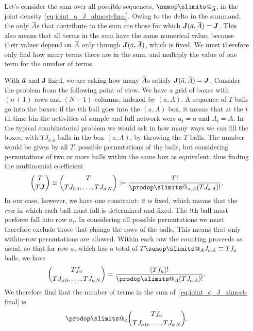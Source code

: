 \documentclass[\ifafour a4paper,12pt,\else a5paper,10pt,\fi%
onecolumn,oneside,article,%
british%
]{memoir}
\makeatletter
\theoremstyle{remark}
\theoremstyle{innote}
\def\sum{\DOTSI\sumop\slimits@}
\def\prod{\DOTSI\prodop\slimits@}
\newcommand*{\defd}{\coloneqq}
\renewcommand*{\|}[1][]{\nonscript\,#1\vert\nonscript\;\mathopen{}}
\newcommand*{\widebar}[1]{{\mkern1.5mu\skew{2}\overline{\mkern-1.5mu#1\mkern-1.5mu}\mkern 1.5mu}}
\newcommand*{\yAs}{\widebar{A}}%
\newcommand*{\yas}{\widebar{a}}%
\newcommand*{\yJJ}{J}
\newcommand*{\yJ}{\bm{\yJJ}}
\makeatother
\begin{document}
\medskip

Let's consider the sum over all possible sequences, $\sum_{\yAs}$, in the
joint density~\eqref{eq:joint_q_J_almost-final}. Owing to the delta in the
summand, the only $\yAs$s that contribute to the sum are those for which
$\yJ(\yas, \yAs)=\yJ$. This also means that all terms in the sum have the
same numerical value, because their values depend on $\yAs$ only through
$\yJ(\yas, \yAs)$, which is fixed. We must therefore only find how many
terms there are in the sum, and multiply the value of one term for the
number of terms.

With $\yas$ and $\yJ$ fixed, we are asking how many $\yAs$s satisfy
$\yJ(\yas, \yAs)=\yJ$. Consider the problem from the following point of
view. We have a grid of boxes with $(n+1)$ rows and $(N+1)$ columns,
indexed by $(a,A)$. A sequence of $T$ balls go into the boxes: if the $t$th
ball goes into the $(a,A)$ box, it means that at the $t$th time bin the
activities of sample and full network were $a_{t}=a$ and $A_{t}=A$. In the
typical combinatorial problem we would ask in how many ways we can fill the
boxes, with $T J_{a\,A}$ balls in the box $(a,A)$, by throwing the $T$
balls. The number would be given by all $T!$ possible permutations of the
balls, but considering permutations of two or more balls within the same
box as equivalent, thus finding the multinomial coefficient
\begin{equation}
  \label{eq:multinomial_coefficient_generic}
  \binom{T}{T\yJ} \equiv
  \binom{T}{T J_{0\,0}, \dotsc, T J_{n\,N}} 
  \defd
  \frac{T!}{\prod_{a,A}(T J_{a\,A})!}.
\end{equation}
In our case, however, we have one constraint: $\yas$ is fixed, which means
that the \emph{row} in which each ball must fall is determined and fixed.
The $t$th ball must perforce fall into row $a_{t}$. In considering all
possible permutations we must therefore exclude those that change the rows
of the balls. This means that only within-row permutations are allowed.
Within each row the counting proceeds as usual, so that for row $a$, which
has a total of $T\sum_{A}J_{a\,A}\equiv T f_{a}$ balls, we have
\begin{equation}
  \label{eq:multinomial_coefficient_row}
  \binom{T f_{a}}{T J_{a\,0}, \dotsc, T J_{a\,N}} =
  \frac{(T f_{a})!}{\prod_{A}(T J_{a\,A})!}.
\end{equation}
We therefore find that the number of terms in the sum
of~\eqref{eq:joint_q_J_almost-final} is
\begin{equation}
  \label{eq:multinomial_coefficient_withinrow}
  \prod_{a}\binom{T f_{a}}{T J_{a\,0}, \dotsc, T J_{a\,N}}.
\end{equation}
\end{document}

